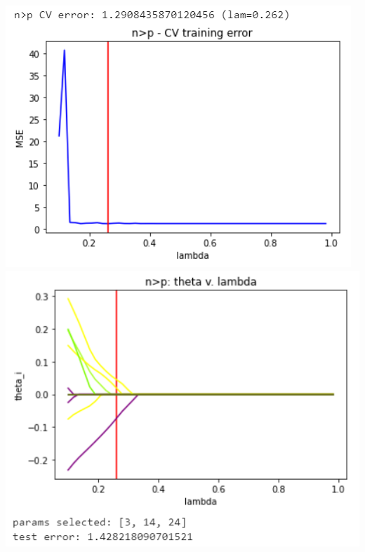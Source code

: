 \documentclass[11pt]{article}
\begin{document}
\begin{center}
\includegraphics[scale=0.7]{charts/ridge_st_corr_n_gt_p_err.PNG}
\includegraphics[scale=0.7]{charts/ridge_st_corr_n_gt_p_thetas.PNG}


\end{center}
\end{document}
